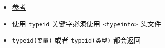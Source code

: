 
\begin{itemize}
\item \href{https://en.cppreference.com/w/cpp/language/typeid}{参考}
\item 使用 \verb|typeid| 关键字必须使用 \verb|<typeinfo>| 头文件
\item \verb|typeid(变量)| 或者 \verb|typeid(类型)| 都会返回
\end{itemize}
